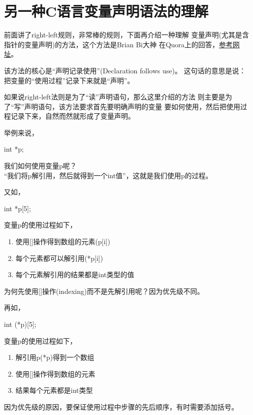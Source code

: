 ﻿\section[Variable declaration(another way)]{另一种C语言变量声明语法的理解}
前面讲了right-left规则，非常棒的规则，下面再介绍一种理解
变量声明(尤其是含指针的变量声明)的方法，这个方法是Brian Bi大神
在Quora上的回答，\href{http://www.quora.com/C-programming-language/Why-doesnt-C-use-better-notation-for-pointers/answer/Brian-Bi}{参考网址}。

该方法的核心是“声明记录使用”(Declaration follows use)。
这句话的意思是说：把变量的“使用过程”记录下来就是“声明”。

如果说right-left法则是为了“读”声明语句，那么这里介绍的方法
则主要是为了“写”声明语句，该方法要求首先要明确声明的变量
要如何使用，然后把使用过程记录下来，自然而然就形成了变量声明。

举例来说，

\begin{cppcode}
  int *p;
\end{cppcode}

我们如何使用变量p呢？\\
“我们将p解引用，然后就得到一个int值”，这就是我们使用p的过程。

又如，

\begin{cppcode}
  int *p[5];
\end{cppcode}

变量p的使用过程如下，
\begin{enumerate}
  \item 使用[]操作得到数组的元素(p[i])
  \item 每个元素都可以解引用(*p[i])
  \item 每个元素解引用的结果都是int类型的值
\end{enumerate}
为何先使用[]操作(indexing)而不是先解引用呢？因为优先级不同。

再如，

\begin{cppcode}
  int (*p)[5];
\end{cppcode}

变量p的使用过程如下，
\begin{enumerate}
  \item 解引用p(*p)得到一个数组
  \item 使用[]操作得到数组的元素
  \item 结果每个元素都是int类型
\end{enumerate}
因为优先级的原因，要保证使用过程中步骤的先后顺序，有时需要添加括号。

